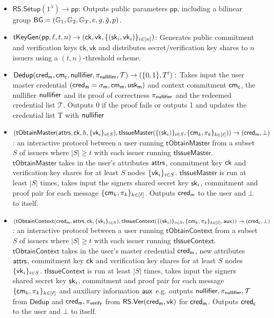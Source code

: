 \begin{definition}[tSIRIS]
    \begin{itemize}
    \item $\mathsf{RS.Setup}(1^\lambda) \to \mathsf{pp}$: Outputs public parameters $\mathsf{pp}$, including a bilinear group $\mathsf{BG} = (\mathbb{G}_1, \mathbb{G}_2, \mathbb{G}_T, e, g, \tilde{g}, p)$.

    \item $\mathsf{tKeyGen}(\mathsf{pp}, \ell, t, n) \to (\mathsf{ck}, \mathsf{vk}, \{(\mathsf{sk}_i, \mathsf{vk}_i)\}_{i \in [n]})$: Generates public commitment and verification keys  $\mathsf{ck}, \mathsf{vk}$ and distributes secret/verification key shares to $n$ issuers using a $(t,n)$-threshold scheme.

    \item $\mathsf{Dedup}(\mathsf{cred_m}, \mathsf{cm_c}, \mathsf{nullifier}, \pi_{\mathsf{nullifier}}, \mathcal{T}) \to (\{0,1\}, T'):$ Takes input the user master credential $(\mathsf{cred_m} = \sigma_{\mathsf{m}}, \mathsf{cm_m}, \mathsf{usk_m})$ and context commitment $\mathsf{cm_c}$, the nullifier $\mathsf{nullifier}$ and its proof of correctness $\pi_{\mathsf{nullifier}}$ and the redeemed credential list $\mathcal{T}$. Outputs 0 if the proof fails or outputs 1 and updates the credential list T with $\mathsf{nullifier}$

    \item $(\mathsf{tObtainMaster}(\mathsf{attrs}, \mathsf{ck},h, \{\mathsf{vk}_i\}_{i \in S}), \mathsf{tIssueMaster}(\{(\mathsf{sk}_i)\}_{i \in S}, \{\mathsf{cm}_k, \pi_k\}_{k \in [\ell]})) \to (\mathsf{cred_m}, \bot)$: an interactive protocol between a user running $\mathsf{tObtainMaster}$ from a subset $S$ of issuers where $|S| \geq t$ with each issuer running $\mathsf{tIssueMaster}$. $\mathsf{tObtainMaster}$ takes in the user's attributes $\mathsf{attrs}$, commitment key $\mathsf{ck}$ and verification key shares for at least $S$ nodes $\{\mathsf{vk}_i\}_{i \in S}$. $\mathsf{tIssueMaster}$ is run at least $|S|$ times, takes input the signers shared secret key $\mathsf{sk}_i$, commitment and proof pair for each message  $\{\mathsf{cm}_k, \pi_k\}_{k \in [\ell]}$. Outputs $\mathsf{cred_m}$ to the user and $\bot$ to itself.

    \item $(\mathsf{tObtainContext}(\mathsf{cred_m}, \mathsf{attrs}, \mathsf{ck}, \{\mathsf{vk}_i\}_{i \in S}), \mathsf{tIssueContext}(\{(\mathsf{sk}_i)\}_{i \in S}, \{\mathsf{cm}_k, \pi_k\}_{k \in [\ell]}, \mathsf{aux})) \to (\mathsf{cred_c}, \bot)$: an interactive protocol between a user running $\mathsf{tObtainContext}$ from a subset $S$ of issuers where $|S| \geq t$ with each issuer running $\mathsf{tIssueContext}$.
    $\mathsf{tObtainContext}$ takes in the user's master credential $\mathsf{cred_m}$, new attributes $\mathsf{attrs}$, commitment key $\mathsf{ck}$ and verification key shares for at least $S$ nodes $\{\mathsf{vk}_i\}_{i \in S}$. $\mathsf{tIssueContext}$ is run at least $|S|$ times, takes input the signers shared secret key $\mathsf{sk}_i$, commitment and proof pair for each message  $\{\mathsf{cm}_k, \pi_k\}_{k \in [\ell]}$ and auxiliary information $\mathsf{aux}$ e.g. outputs $\mathsf{nullifier}, \pi_{\mathsf{nullifier}},\mathcal{T}$ from $\mathsf{Dedup}$ and $\mathsf{cred_m}, \pi_{\mathsf{verify}}$ from $\mathsf{RS.Ver}(\mathsf{cred_m}, \mathsf{vk})$ for $\mathsf{cred_m}$. Outputs $\mathsf{cred_c}$ to the user and $\bot$ to itself.


\end{itemize}
\end{definition}
